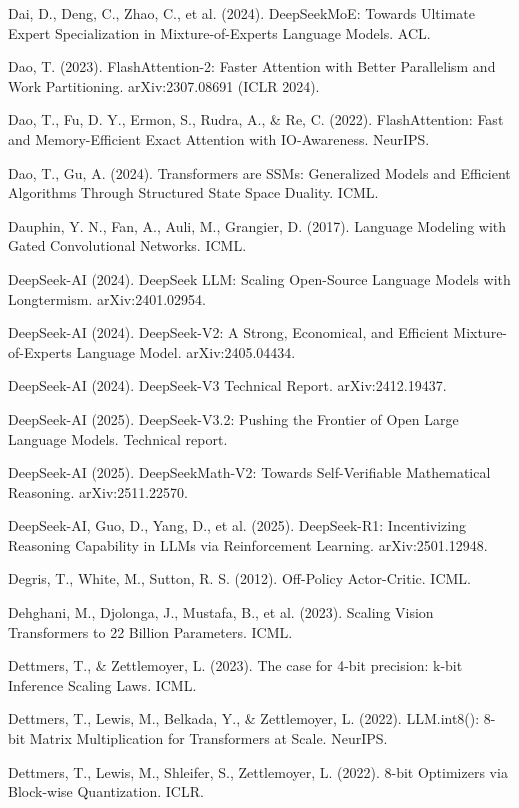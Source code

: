 {\begin{enumerate}[leftmargin=*,itemsep=1pt,label={[\arabic*]}]
\item Dai, D., Deng, C., Zhao, C., et al. (2024). DeepSeekMoE: Towards Ultimate Expert Specialization in Mixture-of-Experts Language Models. ACL.
\item Dao, T. (2023). FlashAttention-2: Faster Attention with Better Parallelism and Work Partitioning. arXiv:2307.08691 (ICLR 2024).
\item Dao, T., Fu, D. Y., Ermon, S., Rudra, A., \& Re, C. (2022). FlashAttention: Fast and Memory-Efficient Exact Attention with IO-Awareness. NeurIPS.
\item Dao, T., Gu, A. (2024). Transformers are SSMs: Generalized Models and Efficient Algorithms Through Structured State Space Duality. ICML.
\item Dauphin, Y. N., Fan, A., Auli, M., Grangier, D. (2017). Language Modeling with Gated Convolutional Networks. ICML.
\item DeepSeek-AI (2024). DeepSeek LLM: Scaling Open-Source Language Models with Longtermism. arXiv:2401.02954.
\item DeepSeek-AI (2024). DeepSeek-V2: A Strong, Economical, and Efficient Mixture-of-Experts Language Model. arXiv:2405.04434.
\item DeepSeek-AI (2024). DeepSeek-V3 Technical Report. arXiv:2412.19437.
\item DeepSeek-AI (2025). DeepSeek-V3.2: Pushing the Frontier of Open Large Language Models. Technical report.
\item DeepSeek-AI (2025). DeepSeekMath-V2: Towards Self-Verifiable Mathematical Reasoning. arXiv:2511.22570.
\item DeepSeek-AI, Guo, D., Yang, D., et al. (2025). DeepSeek-R1: Incentivizing Reasoning Capability in LLMs via Reinforcement Learning. arXiv:2501.12948.
\item Degris, T., White, M., Sutton, R. S. (2012). Off-Policy Actor-Critic. ICML.
\item Dehghani, M., Djolonga, J., Mustafa, B., et al. (2023). Scaling Vision Transformers to 22 Billion Parameters. ICML.
\item Dettmers, T., \& Zettlemoyer, L. (2023). The case for 4-bit precision: k-bit Inference Scaling Laws. ICML.
\item Dettmers, T., Lewis, M., Belkada, Y., \& Zettlemoyer, L. (2022). LLM.int8(): 8-bit Matrix Multiplication for Transformers at Scale. NeurIPS.
\item Dettmers, T., Lewis, M., Shleifer, S., Zettlemoyer, L. (2022). 8-bit Optimizers via Block-wise Quantization. ICLR.

\end{enumerate}}

